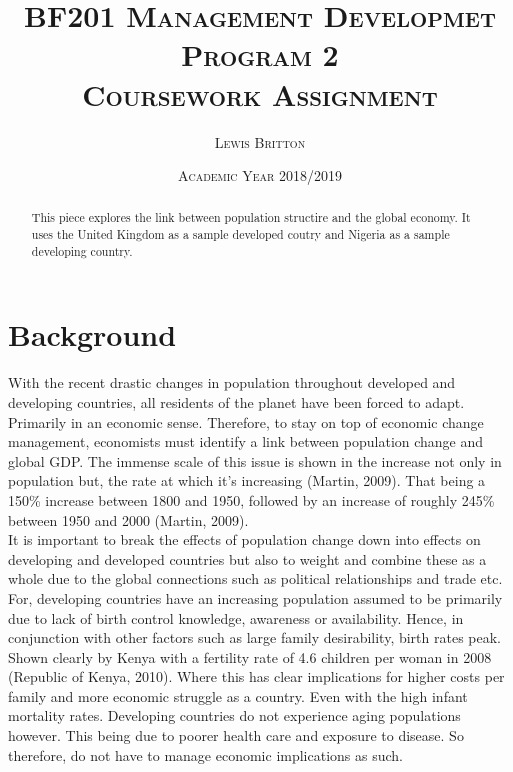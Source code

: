\documentclass[11pt, english]{article}
\begin{document}

        \title{\textsc{BF201 Management Developmet Program 2\\ Coursework Assignment}}
        \author{\textsc{Lewis Britton}}
        \date{\textsc{Academic Year 2018/2019}}
        \maketitle
	
	\begin{abstract}
	This piece explores the link between population structire and the global economy. It uses the United Kingdom as a sample developed coutry and Nigeria as a sample developing country.
	\end{abstract}

\newpage


	\renewcommand{\contentsname}{Table of Contents}

        \tableofcontents

\newpage


\section{Background}

	With the recent drastic changes in population throughout developed and developing countries, all residents of the planet have been forced to adapt. Primarily in an economic sense. Therefore, to stay on top of economic change management, economists must identify a link between population change and global GDP. The immense scale of this issue is shown in the increase not only in population but, the rate at which it's increasing (Martin, 2009). That being a 150\% increase between 1800 and 1950, followed by an increase of roughly 245\% between 1950 and 2000 (Martin, 2009).\\

	It is important to break the effects of population change down into effects on developing and developed countries but also to weight and combine these as a whole due to the global connections such as political relationships and trade etc. For, developing countries have an increasing population assumed to be primarily due to lack of birth control knowledge, awareness or availability. Hence, in conjunction with other factors such as large family desirability, birth rates peak. Shown clearly by Kenya with a fertility rate of 4.6 children per woman in 2008 (Republic of Kenya, 2010). Where this has clear implications for higher costs per family and more economic struggle as a country. Even with the high infant mortality rates. Developing countries do not experience aging populations however. This being due to poorer health care and exposure to disease. So therefore, do not have to manage economic implications as such.\\
\end{document}
